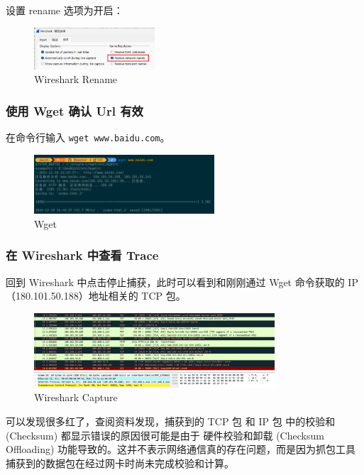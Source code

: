 \documentclass[14pt,a4paper,UTF8,twoside]{article}
\begin{document}
设置 rename 选项为开启：

\begin{figure}[H]
  \centering
  \includegraphics[width=0.4\textwidth]{lab3/rename.png}
  \caption{Wireshark Rename}
\end{figure}

\subsubsection{使用 Wget 确认 Url 有效}

在命令行输入 \texttt{wget www.baidu.com}。

\begin{figure}[H]
	\centering
	\includegraphics[width=0.6\textwidth]{lab6/wget.png}
	\caption{Wget}
\end{figure}

\subsubsection{在 Wireshark 中查看 Trace}

回到 Wireshark 中点击停止捕获，此时可以看到和刚刚通过 Wget 命令获取的 IP （180.101.50.188）地址相关的 TCP 包。

\begin{figure}[H]
	\centering
	\includegraphics[width=0.8\textwidth]{lab6/wiresharkresult.png}
	\caption{Wireshark Capture}	
\end{figure}

可以发现很多红了，查阅资料发现，捕获到的 TCP 包 和 IP 包 中的校验和 (Checksum) 都显示错误的原因很可能是由于
硬件校验和卸载 (Checksum Offloading) 功能导致的。这并不表示网络通信真的存在问题，而是因为抓包工具
捕获到的数据包在经过网卡时尚未完成校验和计算。
\end{document}
